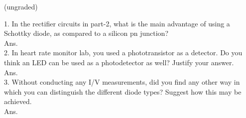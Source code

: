 \documentclass[12pt]{article}
\begin{document}
(ungraded)

1. In the rectifier circuits in part-2, what is the main advantage of using a Schottky diode, as compared to a silicon pn junction?\\
Ans.\\

2. In heart rate monitor lab, you used a phototransistor as a detector. Do you think an LED can be used as a photodetector as well? Justify your answer.\\
Ans.\\

3. Without conducting any I/V measurements, did you find any other way in which you can distinguish the different diode types? Suggest how this may be achieved.\\
Ans.\\
\end{document}
